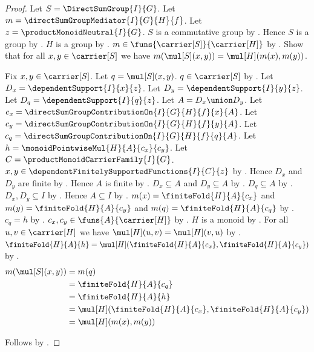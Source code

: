 \begin{proof}
    Let $S=\DirectSumGroup{I}{G}$.
    Let $m=\directSumGroupMediator{I}{G}{H}{f}$.
    Let $z=\productMonoidNeutral{I}{G}$.
    $S$ is a commutative group by .
    Hence $S$ is a group by .
    $H$ is a group by .
    $m\in\funs{\carrier[S]}{\carrier[H]}$ by
        .
    Show that for all $x,y\in\carrier[S]$ we have
        $m(\mul[S](x,y))=\mul[H](m(x),m(y))$.
    \begin{subproof}
        Fix $x,y\in\carrier[S]$.
        Let $q=\mul[S](x,y)$.
        $q\in\carrier[S]$ by
            .
        Let $D_x=\dependentSupport{I}{x}{z}$.
        Let $D_y=\dependentSupport{I}{y}{z}$.
        Let $D_q=\dependentSupport{I}{q}{z}$.
        Let $A=D_x\union D_y$.
        Let $c_x=\directSumGroupContributionOn{I}{G}{H}{f}{x}{A}$.
        Let $c_y=\directSumGroupContributionOn{I}{G}{H}{f}{y}{A}$.
        Let $c_q=\directSumGroupContributionOn{I}{G}{H}{f}{q}{A}$.
        Let $h=\monoidPointwiseMul{H}{A}{c_x}{c_y}$.
        Let $C=\productMonoidCarrierFamily{I}{G}$.
        $x,y\in\dependentFinitelySupportedFunctions{I}{C}{z}$ by
            .
        Hence $D_x$ and $D_y$ are finite by
            .
        Hence $A$ is finite by .
        $D_x\subseteq A$ and $D_y\subseteq A$ by
            .
        $D_q\subseteq A$ by .
        $D_x,D_y\subseteq I$ by .
        Hence $A\subseteq I$ by .
        $m(x)=\finiteFold{H}{A}{c_x}$ and
            $m(y)=\finiteFold{H}{A}{c_y}$ and
            $m(q)=\finiteFold{H}{A}{c_q}$ by
            .
        $c_q=h$ by .
        $c_x,c_y\in\funs{A}{\carrier[H]}$ by
            .
        $H$ is a monoid by .
        For all $u,v\in\carrier[H]$ we have
            $\mul[H](u,v)=\mul[H](v,u)$ by
            .
        $\finiteFold{H}{A}{h}
            =\mul[H](\finiteFold{H}{A}{c_x},
                \finiteFold{H}{A}{c_y})$ by
            .
        \begin{align*}
            m(\mul[S](x,y))
                &= m(q)
                \\
                &= \finiteFold{H}{A}{c_q}
                \\
                &= \finiteFold{H}{A}{h}
                \\
                &= \mul[H](\finiteFold{H}{A}{c_x},
                    \finiteFold{H}{A}{c_y})
                \\
                &= \mul[H](m(x),m(y))
        \end{align*}
    \end{subproof}
    Follows by .
\end{proof}

